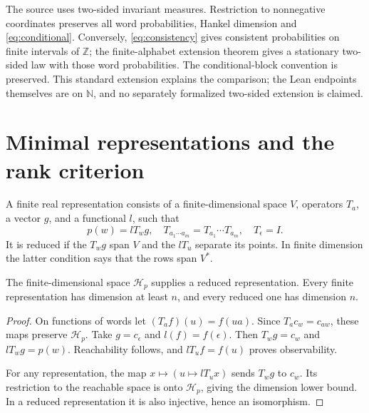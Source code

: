 The source \cite{BJMP2026} uses two-sided invariant measures. Restriction to nonnegative coordinates preserves all word probabilities, Hankel dimension and \eqref{eq:conditional}. Conversely, \eqref{eq:consistency} gives consistent probabilities on finite intervals of \(\mathbb Z\); the finite-alphabet extension theorem gives a stationary two-sided law with those word probabilities. The conditional-block convention is preserved. This standard extension explains the comparison; the Lean endpoints themselves are on \(\mathbb N\), and no separately formalized two-sided extension is claimed.

\section{Minimal representations and the rank criterion}
A finite real representation consists of a finite-dimensional space \(V\), operators \(T_a\), a vector \(g\), and a functional \(l\), such that
\[
 p(w)=lT_wg,\quad T_{a_1\cdots a_m}=T_{a_1}\cdots T_{a_m},\quad T_\epsilon=I.
\]
It is reduced if the \(T_wg\) span \(V\) and the \(lT_u\) separate its points. In finite dimension the latter condition says that the rows span \(V^*\).

\begin{lemma}\label{lem:hankel}
The finite-dimensional space \(\mathcal H_p\) supplies a reduced representation. Every finite representation has dimension at least \(n\), and every reduced one has dimension \(n\).
\end{lemma}
\begin{proof}
On functions of words let \((T_af)(u)=f(ua)\). Since \(T_ac_w=c_{aw}\), these maps preserve \(\mathcal H_p\). Take \(g=c_\epsilon\) and \(l(f)=f(\epsilon)\). Then \(T_wg=c_w\) and \(lT_wg=p(w)\). Reachability follows, and \(lT_uf=f(u)\) proves observability.

For any representation, the map \(x\mapsto(u\mapsto lT_ux)\) sends \(T_wg\) to \(c_w\). Its restriction to the reachable space is onto \(\mathcal H_p\), giving the dimension lower bound. In a reduced representation it is also injective, hence an isomorphism.
\end{proof}

